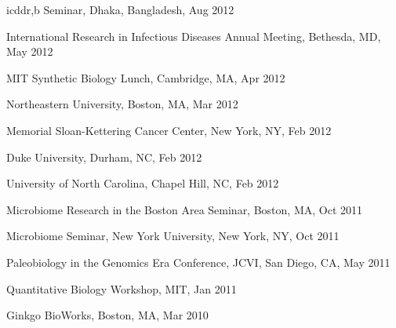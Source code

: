 \documentclass[overlapped,line,11pt]{res}
\newenvironment{list2}{
  \begin{list}{$\bullet$}{%
      \setlength{\itemsep}{0in}
      \setlength{\parsep}{0in} \setlength{\parskip}{0in}
      \setlength{\topsep}{0in} \setlength{\partopsep}{0in} 
      \setlength{\leftmargin}{0.2in}}}{\end{list}}
\begin{document}
\begin{resume}
\begin{revnumerate}[62]
\item {icddr,b Seminar, Dhaka,
  Bangladesh, Aug 2012}

\item {International Research in
  Infectious Diseases Annual Meeting, Bethesda, MD, May 2012}

\item {MIT Synthetic Biology Lunch, Cambridge, MA, Apr 2012}

\item {Northeastern University, Boston, MA, Mar 2012}

\item {Memorial Sloan-Kettering Cancer Center, New York, NY,
  Feb 2012}

\item {Duke University, Durham, NC, Feb 2012}

\item {University of North Carolina, Chapel Hill, NC, Feb 2012}

\item {Microbiome Research
  in the Boston Area Seminar, Boston, MA, Oct 2011}

\item {Microbiome Seminar,
  New York University, New York, NY, Oct 2011}

\item {Paleobiology in the Genomics Era
  Conference, JCVI, San Diego, CA, May 2011}

\item {Quantitative Biology Workshop, MIT, Jan 2011}

\item {Ginkgo BioWorks, Boston, MA, Mar 2010}

\end{revnumerate}




\end{resume}
\end{document}
